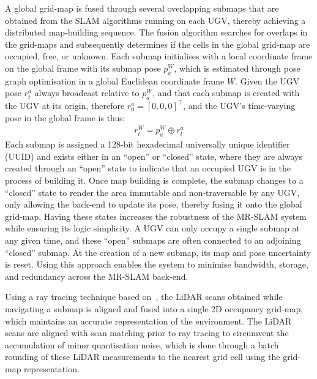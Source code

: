 A global grid-map is fused through several overlapping submaps that are obtained from the SLAM algorithms running on each UGV, thereby achieving a distributed map-building sequence. The fusion algorithm searches for overlaps in the grid-maps and subsequently determines if the cells in the global grid-map are occupied, free, or unknown. Each submap initialises with a local coordinate frame on the global frame with its submap pose $p^W_a$, which is estimated through pose graph optimisation in a global Euclidean coordinate frame $W$. Given the UGV pose $r^a_t$ always broadcast relative to $p_a^W$, and that each submap is created with the UGV at its origin, therefore $r^a_0 = [0, 0, 0]^\intercal$, and the UGV's time-varying pose in the global frame is thus:
\begin{align}
r^W_t = p^W_a \oplus r^a_t
\end{align}
Each submap is assigned a 128-bit hexadecimal universally unique identifier (UUID) and exists either in an ``open'' or “closed” state, where they are always created through an “open” state to indicate that an occupied UGV is in the process of building it. Once map building is complete, the submap changes to a “closed” state to render the area immutable and non-traversable by any UGV, only allowing the back-end to update its pose, thereby fusing it onto the global grid-map. Having these states increases the robustness of the MR-SLAM system while ensuring its logic simplicity. A UGV can only occupy a single submap at any given time, and these “open” submaps are often connected to an adjoining “closed” submap. At the creation of a new submap, its map and pose uncertainty is reset. Using this approach enables the system to minimise bandwidth, storage, and redundancy across the MR-SLAM back-end.


Using a ray tracing technique based on~\cite{bresenham_algorithm_1965}, the LiDAR scans obtained while navigating a submap is aligned and fused into a single 2D occupancy grid-map, which maintains an accurate representation of the environment. The LiDAR scans are aligned with scan matching prior to ray tracing to circumvent the accumulation of minor quantisation noise, which is done through a batch rounding of these LiDAR measurements to the nearest grid cell using the grid-map representation.

